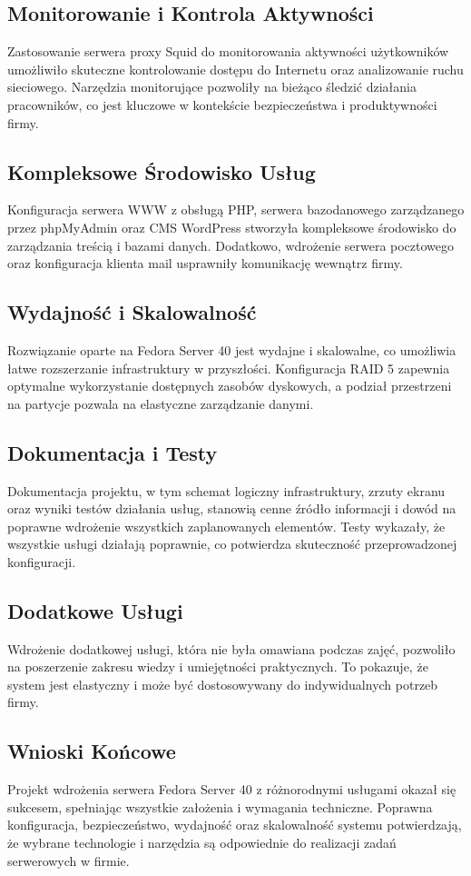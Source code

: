 \documentclass[a4paper]{article}
\begin{document}
\subsection{Monitorowanie i Kontrola Aktywności}
Zastosowanie serwera proxy Squid do monitorowania aktywności użytkowników umożliwiło skuteczne kontrolowanie dostępu do Internetu oraz analizowanie ruchu sieciowego. Narzędzia monitorujące pozwoliły na bieżąco śledzić działania pracowników, co jest kluczowe w kontekście bezpieczeństwa i produktywności firmy.

\subsection{Kompleksowe Środowisko Usług}
Konfiguracja serwera WWW z obsługą PHP, serwera bazodanowego zarządzanego przez phpMyAdmin oraz CMS WordPress stworzyła kompleksowe środowisko do zarządzania treścią i bazami danych. Dodatkowo, wdrożenie serwera pocztowego oraz konfiguracja klienta mail usprawniły komunikację wewnątrz firmy.

\subsection{Wydajność i Skalowalność}
Rozwiązanie oparte na Fedora Server 40 jest wydajne i skalowalne, co umożliwia łatwe rozszerzanie infrastruktury w przyszłości. Konfiguracja RAID 5 zapewnia optymalne wykorzystanie dostępnych zasobów dyskowych, a podział przestrzeni na partycje pozwala na elastyczne zarządzanie danymi.

\subsection{Dokumentacja i Testy}
Dokumentacja projektu, w tym schemat logiczny infrastruktury, zrzuty ekranu oraz wyniki testów działania usług, stanowią cenne źródło informacji i dowód na poprawne wdrożenie wszystkich zaplanowanych elementów. Testy wykazały, że wszystkie usługi działają poprawnie, co potwierdza skuteczność przeprowadzonej konfiguracji.

\subsection{Dodatkowe Usługi}
Wdrożenie dodatkowej usługi, która nie była omawiana podczas zajęć, pozwoliło na poszerzenie zakresu wiedzy i umiejętności praktycznych. To pokazuje, że system jest elastyczny i może być dostosowywany do indywidualnych potrzeb firmy.

\subsection{Wnioski Końcowe}
Projekt wdrożenia serwera Fedora Server 40 z różnorodnymi usługami okazał się sukcesem, spełniając wszystkie założenia i wymagania techniczne. Poprawna konfiguracja, bezpieczeństwo, wydajność oraz skalowalność systemu potwierdzają, że wybrane technologie i narzędzia są odpowiednie do realizacji zadań serwerowych w firmie.
\newpage
\nocite{k8s-docs}
\nocite{k8s-blog}
\nocite{k8s-github}
\printbibliography[heading=bibnumbered, label=Literatura, title=Literatura]
\end{document}
